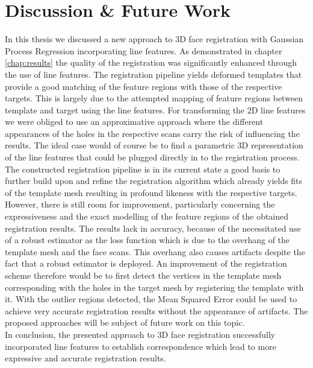 \chapter{Discussion \& Future Work}
In this thesis we discussed a new approach to 3D face registration with Gaussian Process Regression incorporating line features. As demonstrated in chapter \ref{chap:results} the quality of the registration was significantly enhanced through the use of line features. The registration pipeline yields deformed templates that provide a good matching of the feature regions with those of the respective targets. This is largely due to the attempted mapping of feature regions between template and target using the line features. For
transforming the 2D line features we were obliged to use an approximative approach where the different appearances of the holes in the respective scans carry the risk of influencing the results. The ideal case would of course be to find a parametric 3D representation of the line features that could be plugged directly in to the registration process. The constructed registration pipeline is in its current state a good basis to further build upon and refine the registration algorithm which already yields fits of the template mesh resulting in profound likeness with the respective targets. However, there is still room for improvement, particularly concerning the expressiveness and the exact modelling of the feature regions of the obtained registration results. The results lack in accuracy, because of the necessitated use of a robust estimator as the loss function which is due to the overhang of the template mesh and the face scans. This overhang also causes artifacts despite the fact that a robust estimator is deployed. An improvement of the registration scheme therefore would be to first detect the vertices in the template mesh corresponding with the holes in the target mesh by registering the template with it. With the outlier regions detected, the Mean Squared Error could be used to achieve very accurate registration results without the appearance of artifacts. The proposed approaches will be subject of future work on this topic.\\  
In conclusion, the presented approach to 3D face registration successfully incorporated line features to establish correspondence which lead to more expressive and accurate registration results.

